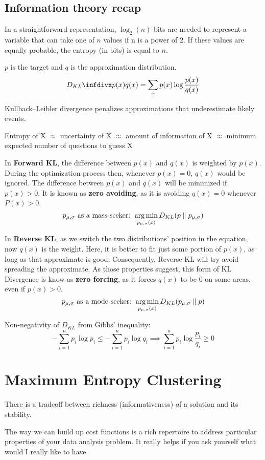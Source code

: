 \documentclass[12pt]{article}
\begin{document}
\subsection{Information theory recap}
\ulb
\item In a straightforward representation, $\log_2(n)$ bits are needed to represent a variable that can take one of $n$ values if n is a power of $2$. If these values are equally probable, the entropy (in bits) is equal to $n$.
\item $p$ is the target and $q$ is the approximation distribution.
\[\dkl{p(x)}{q(x)} = \sum_x p(x)\log\frac{p(x)}{q(x)}\]
\item Kullback–Leibler divergence penalizes approximations that underestimate likely events.
\item Entropy of X $\approx$ uncertainty of X $\approx$ amount of information of X $\approx$ minimum expected number of questions to guess X
\item In \textbf{Forward KL}, the difference between $p(x)$ and $q(x)$ is weighted by $p(x)$. During the optimization process then, whenever $p(x)=0$, $q(x)$ would be ignored. The difference between $p(x)$ and $q(x)$ will be minimized if $p(x)>0$. It is known as \textbf{zero avoiding}, as it is avoiding $q(x)=0$ whenever $P(x)>0$. \\
\[ p_{\mu,\sigma} \text{ as a mass-seeker: } \operatorname*{arg\,min}_{p_{\mu,\sigma}(x)} D_{KL}(p \parallel p_{\mu,\sigma}) \]
\item In \textbf{Reverse KL}, as we switch the two distributions' position in the equation, now $q(x)$ is the weight. Here, it is better to fit just some portion of $p(x)$, as long as that approximate is good. Consequently, Reverse KL will try avoid spreading the approximate. As those properties suggest, this form of KL Divergence is know as \textbf{zero forcing}, as it forces $q(x)$ to be $0$ on some areas, even if $p(x)>0$. \\
\[ p_{\mu,\sigma} \text{ as a mode-seeker: } \operatorname*{arg\,min}_{p_{\mu,\sigma}(x)} D_{KL}(p_{\mu,\sigma} \parallel p) \]
\item Non-negativity of $D_{KL}$ from Gibbs' inequality:
\[ -\sum_{i=1}^n p_i \log p_i \leq -\sum_{i=1}^n p_i \log q_i \implies \sum_{i=1}^n p_i \log\frac{p_i}{q_i} \geq 0 \]
\ule

\section{Maximum Entropy Clustering}
\ulb
\item There is a tradeoff between richness (informativeness) of a solution and its stability.
\item The way we can build up cost functions is a rich repertoire to address particular properties of your data analysis problem. It really helps if you ask yourself what would I really like to have.
\ule
\end{document}

